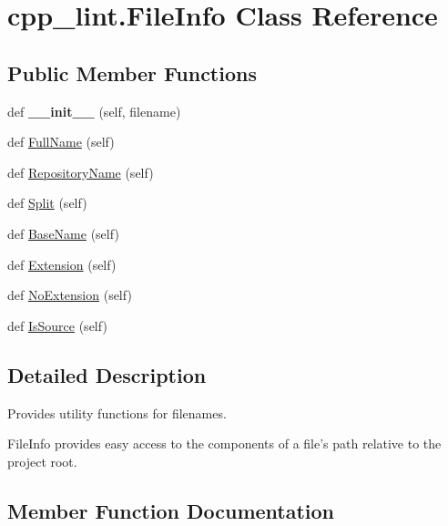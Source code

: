 \hypertarget{classcpp__lint_1_1_file_info}{}\section{cpp\+\_\+lint.\+File\+Info Class Reference}
\label{classcpp__lint_1_1_file_info}
\subsection*{Public Member Functions}
\begin{DoxyCompactItemize}
\item 
\mbox{\label{classcpp__lint_1_1_file_info_ab10a6a6e6aad00e84c5a8eb99b8e82b9}} 
def {\bfseries \+\_\+\+\_\+init\+\_\+\+\_\+} (self, filename)
\item 
def \mbox{\hyperlink{classcpp__lint_1_1_file_info_a36b6595254838baeb10a7b4df6c97e46}{Full\+Name}} (self)
\item 
def \mbox{\hyperlink{classcpp__lint_1_1_file_info_a62630bdb99c90fa78ea093c9a8512bb4}{Repository\+Name}} (self)
\item 
def \mbox{\hyperlink{classcpp__lint_1_1_file_info_a0bcdc189921dccc91e7bd9ffad0d57de}{Split}} (self)
\item 
def \mbox{\hyperlink{classcpp__lint_1_1_file_info_ab5d91e42e21b9fdc9b2e4bb5e30d40b3}{Base\+Name}} (self)
\item 
def \mbox{\hyperlink{classcpp__lint_1_1_file_info_ac968b5d06e9638f7412977aa772261d1}{Extension}} (self)
\item 
def \mbox{\hyperlink{classcpp__lint_1_1_file_info_a211532e8ea7f3ca3e02124bb3ff55426}{No\+Extension}} (self)
\item 
def \mbox{\hyperlink{classcpp__lint_1_1_file_info_aa00d8322dc7ee1b1f523ea5c2a38c36a}{Is\+Source}} (self)
\end{DoxyCompactItemize}


\subsection{Detailed Description}
\begin{DoxyVerb}Provides utility functions for filenames.

FileInfo provides easy access to the components of a file's path
relative to the project root.
\end{DoxyVerb}
 

\subsection{Member Function Documentation}
\mbox{\label{classcpp__lint_1_1_file_info_ab5d91e42e21b9fdc9b2e4bb5e30d40b3}} 

